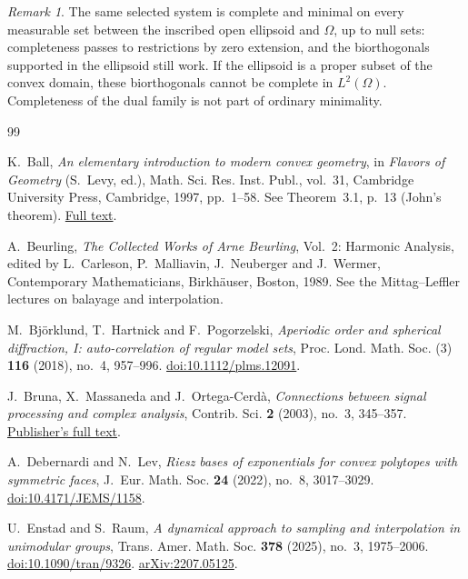 \documentclass[a4paper,12pt,reqno]{amsart}
\theoremstyle{remark}
\newtheorem{remark}[theorem]{Remark}
\numberwithin{equation}{section}
\begin{document}
\begin{remark}\label{cm:rem:scope}
The same selected system is complete and minimal on every measurable
set between the inscribed open ellipsoid and $\Omega$, up to null
sets: completeness passes to restrictions by zero extension, and
the biorthogonals supported in the ellipsoid still work. If the ellipsoid
is a proper subset of the convex domain, these biorthogonals cannot
be complete in $L^2(\Omega)$. Completeness of the dual family is not
part of ordinary minimality.
\end{remark}

\begin{thebibliography}{99}

K.~Ball,
\emph{An elementary introduction to modern convex geometry},
in \emph{Flavors of Geometry} (S.~Levy, ed.),
Math. Sci. Res. Inst. Publ., vol.~31,
Cambridge University Press, Cambridge, 1997, pp.~1--58.
See Theorem~3.1, p.~13 (John's theorem).
\href{https://library.slmath.org/books/Book31/files/ball.pdf}{Full text}.

A.~Beurling,
\emph{The Collected Works of Arne Beurling}, Vol.~2: Harmonic Analysis,
edited by L.~Carleson, P.~Malliavin, J.~Neuberger and J.~Wermer,
Contemporary Mathematicians, Birkh\"auser, Boston, 1989.
See the Mittag--Leffler lectures on balayage and interpolation.

M.~Bj\"orklund, T.~Hartnick and F.~Pogorzelski,
\emph{Aperiodic order and spherical diffraction, I: auto-correlation of
regular model sets},
Proc. Lond. Math. Soc. (3) \textbf{116} (2018), no.~4, 957--996.
\href{https://doi.org/10.1112/plms.12091}{doi:10.1112/plms.12091}.

J.~Bruna, X.~Massaneda and J.~Ortega-Cerdà,
\emph{Connections between signal processing and complex analysis},
Contrib. Sci. \textbf{2} (2003), no.~3, 345--357.
\href{https://publicacions.iec.cat/repository/pdf/00000022/00000096.pdf}{Publisher's full text}.

A.~Debernardi and N.~Lev,
\emph{Riesz bases of exponentials for convex polytopes with symmetric faces},
J.~Eur. Math. Soc. \textbf{24} (2022), no.~8, 3017--3029.
\href{https://doi.org/10.4171/JEMS/1158}{doi:10.4171/JEMS/1158}.

U.~Enstad and S.~Raum,
\emph{A dynamical approach to sampling and interpolation in unimodular
groups},
Trans. Amer. Math. Soc. \textbf{378} (2025), no.~3, 1975--2006.
\href{https://doi.org/10.1090/tran/9326}{doi:10.1090/tran/9326}.
\href{https://arxiv.org/abs/2207.05125}{arXiv:2207.05125}.


\end{thebibliography}
\end{document}
